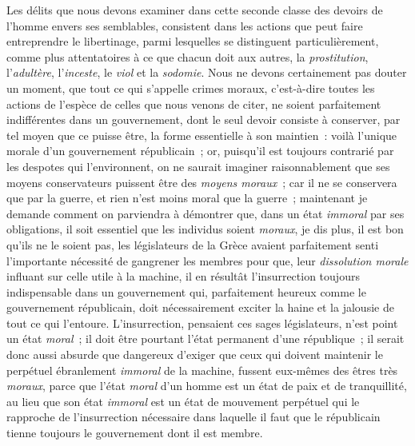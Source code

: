 \documentclass[french,twoside]{book} %
\begin{document}
Les délits que nous devons examiner dans cette seconde classe des devoirs de l’homme envers ses semblables, consistent dans les actions que peut faire entreprendre le libertinage, parmi lesquelles se distinguent particulièrement, comme plus attentatoires à ce que chacun doit aux autres, la {\itshape prostitution}, l’{\itshape adultère}, l’{\itshape inceste}, le {\itshape viol} et la {\itshape sodomie}. Nous ne devons certainement pas douter un moment, que tout ce qui s’appelle crimes moraux, c’est-à-dire toutes les actions de l’espèce de celles que nous venons de citer, ne soient parfaitement indifférentes dans un gouvernement, dont le seul devoir consiste à conserver, par tel moyen que ce puisse être, la forme essentielle à son maintien : voilà l’unique morale d’un gouvernement républicain ; or, puisqu’il est toujours contrarié par les despotes qui l’environnent, on ne saurait imaginer raisonnablement que ses moyens conservateurs puissent être des {\itshape moyens moraux} ; car il ne se conservera que par la guerre, et rien n’est moins moral que la guerre ; maintenant je demande comment on parviendra à démontrer que, dans un état {\itshape immoral} par ses obligations, il soit essentiel que les individus soient {\itshape moraux}, je dis plus, il est bon qu’ils ne le soient pas, les législateurs de la Grèce avaient parfaitement senti l’importante nécessité de gangrener les membres pour que, leur {\itshape dissolution morale} influant sur celle utile à la machine, il en résultât l’insurrection toujours indispensable dans un gouvernement qui, parfaitement heureux comme le gouvernement républicain, doit nécessairement exciter la haine et la jalousie de tout ce qui l’entoure. L’insurrection, pensaient ces sages législateurs, n’est point un état {\itshape moral} ; il doit être pourtant l’état permanent d’une république ; il serait donc aussi absurde que dangereux d’exiger que ceux qui doivent maintenir le perpétuel ébranlement {\itshape immoral} de la machine, fussent eux-mêmes des êtres très {\itshape moraux}, parce que l’état {\itshape moral} d’un homme est un état de paix et de tranquillité, au lieu que son état {\itshape immoral} est un état de mouvement perpétuel qui le rapproche de l’insurrection nécessaire dans laquelle il faut que le républicain tienne toujours le gouvernement dont il est membre.\par
\end{document}

